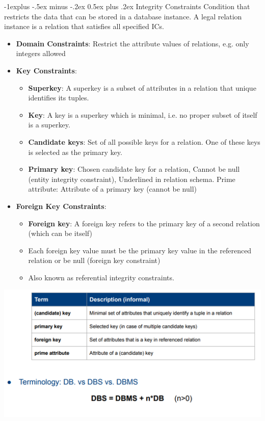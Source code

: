 \documentclass[12pt, landscape]{article}
\makeatletter
\renewcommand{\subsection}{\@startsection{subsection}{2}{0.1mm}%
                                {-1explus -.5ex minus -.2ex}%
                                {0.5ex plus .2ex}%
                                {\normalfont\normalsize\bfseries}}
\makeatother
\begin{document}
\begin{multicols*}{3}
{\subsection{Integrity Constraints}
Condition that restricts the data that can be stored in a database instance. A legal relation instance is a relation that satisfies all specified ICs.
\begin{itemize}
	\item \textbf{Domain Constraints}:  Restrict the attribute values of relations, e.g. only integers allowed
	\item \textbf{Key Constraints}:
	\begin{itemize}
		\item \textbf{Superkey}: A superkey is a subset of attributes in a relation that unique identifies its tuples.
		\item \textbf{Key}:  A key is a superkey which is minimal, i.e. no proper subset of itself is a superkey. 
		\item \textbf{Candidate keys}: Set of all possible keys for a relation. One of these keys is selected as the primary key.
		\item \textbf{Primary key}: Chosen candidate key for a relation, Cannot be null (entity integrity constraint), Underlined in relation schema. Prime attribute: Attribute of a primary key (cannot be null)
	\end{itemize}
	\item \textbf{Foreign Key Constraints}:
	\begin{itemize}
		\item \textbf{Foreign key}:   A foreign key refers to the primary key of a second relation (which can be itself)
		\item Each foreign key value must be the primary key value in the referenced relation or be null (foreign key constraint)
		\item  Also known as referential integrity constraints.
	\end{itemize}
\end{itemize}
\centerline{\includegraphics[width=0.8 \linewidth]{integrityconstraints}}
}


\end{multicols*}
\end{document}
